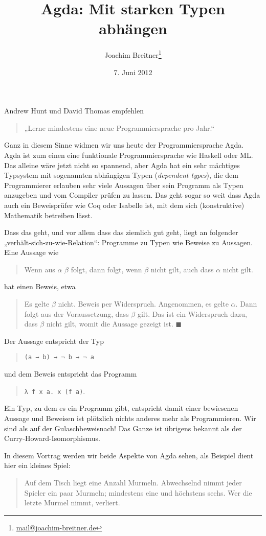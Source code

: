 \documentclass[12pt,parskip=half,headings=normal,abstract]{scrartcl}
\author{Joachim Breitner\footnote{\href{mailto:mail@joachim-breitner.de}{mail@joachim-breitner.de}}}
\title{Agda: Mit starken Typen abhängen}
\date{7. Juni 2012}
\newcommand{\li}{\lstinline}
\begin{document}
\maketitle

Andrew Hunt und David Thomas empfehlen
\begin{quote}
„Lerne mindestens eine neue Programmiersprache pro Jahr.“
\end{quote}
Ganz in diesem Sinne widmen wir uns heute der Programmiersprache Agda. Agda ist zum einen eine funktionale Programmiersprache wie Haskell oder ML. Das alleine wäre jetzt nicht so spannend, aber Agda hat ein sehr mächtiges Typsystem mit sogenannten abhängigen Typen (\emph{dependent types}), die dem Programmierer erlauben sehr viele Aussagen über sein Programm als Typen anzugeben und vom Compiler prüfen zu lassen. Das geht sogar so weit dass Agda auch ein Beweisprüfer wie Coq oder Isabelle ist, mit dem sich (konstruktive) Mathematik betreiben lässt.

Dass das geht, und vor allem dass das ziemlich gut geht, liegt an folgender „verhält-sich-zu-wie-Relation“: Programme zu Typen wie Beweise zu Aussagen. Eine Aussage wie
\begin{quote}
Wenn aus $\alpha$ $\beta$ folgt, dann folgt,
wenn $\beta$ nicht gilt,  auch
dass $\alpha$ nicht gilt.
\end{quote}
hat einen Beweis, etwa
\begin{quote}
Es gelte $\beta$ nicht. Beweis per Widerspruch. Angenommen, es
gelte $\alpha$. Dann folgt aus der Voraussetzung, dass $\beta$ gilt.
Das ist ein Widerspruch dazu, dass $\beta$ nicht
gilt, womit die Aussage gezeigt ist.
$\blacksquare$
\end{quote}
Der Aussage entspricht der Typ
\begin{quote}
\li!(a → b) → ¬ b → ¬ a!
\end{quote}
und dem Beweis entspricht das Programm
\begin{quote}
\li!λ f x a. x (f a)!.
\end{quote}
Ein Typ, zu dem es ein Programm gibt, entspricht damit einer bewiesenen Aussage und Beweisen ist plötzlich nichts anderes mehr als Programmieren. Wir sind als auf der Gulaschbeweisnach!  Das Ganze ist übrigens bekannt als der Curry-Howard-Isomorphismus.

In diesem Vortrag werden wir beide Aspekte von Agda sehen, als Beispiel dient hier ein kleines Spiel:

\begin{quote}
Auf dem Tisch liegt eine Anzahl Murmeln. Abwechselnd nimmt jeder Spieler ein paar Murmeln; mindestens eine und höchstens sechs. Wer die letzte Murmel nimmt, verliert.
\end{quote}





\appendix

\end{document}
